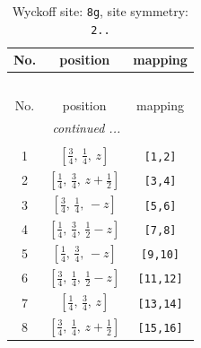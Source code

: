 \documentclass[fleqn,8pt]{jsarticle}
\begin{document}
\begin{longtable}{ccc}
\caption{Wyckoff site: {\tt 8g}, site symmetry: {\tt 2..}}
 \\
 \hline \hline
No. & position & mapping \\ \hline \endfirsthead

\multicolumn{2}{l}{\tablename\ \thetable{}} \\
 \hline \hline
No. & position & mapping \\ \hline \endhead

 \hline \hline
\multicolumn{2}{r}{\footnotesize\it continued ...} \\ \endfoot

 \hline \hline
\multicolumn{2}{r}{} \\ \endlastfoot

1 & $\left[ \frac{3}{4},\, \frac{1}{4},\, z \right]$ & {\tt [1,2]} \\ \hline
2 & $\left[ \frac{1}{4},\, \frac{3}{4},\, z + \frac{1}{2} \right]$ & {\tt [3,4]} \\ \hline
3 & $\left[ \frac{3}{4},\, \frac{1}{4},\, - z \right]$ & {\tt [5,6]} \\ \hline
4 & $\left[ \frac{1}{4},\, \frac{3}{4},\, \frac{1}{2} - z \right]$ & {\tt [7,8]} \\ \hline
5 & $\left[ \frac{1}{4},\, \frac{3}{4},\, - z \right]$ & {\tt [9,10]} \\ \hline
6 & $\left[ \frac{3}{4},\, \frac{1}{4},\, \frac{1}{2} - z \right]$ & {\tt [11,12]} \\ \hline
7 & $\left[ \frac{1}{4},\, \frac{3}{4},\, z \right]$ & {\tt [13,14]} \\ \hline
8 & $\left[ \frac{3}{4},\, \frac{1}{4},\, z + \frac{1}{2} \right]$ & {\tt [15,16]} \\
\end{longtable}
\renewcommand{\arraystretch}{1.2}
\end{document}
